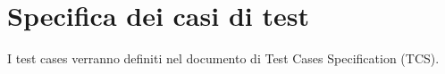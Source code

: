 \chapter{Specifica dei casi di test}
I test cases verranno definiti nel documento di Test Cases Specification (TCS).